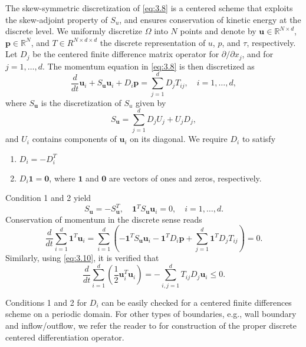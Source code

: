The skew-symmetric discretization of \eqref{eq:3.8} is a centered scheme that exploits the skew-adjoint property of $S_u$, and ensures conservation of kinetic energy at the discrete level. We uniformly discretize $\Omega$ into $N$ points and denote by $\mathbf u \in \mathbb R^{N\times d}$, $\mathbf p \in \mathbb R^N$, and $T \in R^{N\times d\times d} $ the discrete representation of $u$, $p$, and $\tau$, respectively. Let $D_j$ be the centered finite difference matrix operator for $\partial / \partial x_j$, and for $j = 1,\dots,d$. The momentum equation in \eqref{eq:3.8} is then discretized as
\begin{equation} \label{eq:3.13}
	\frac{d}{dt}{\mathbf u}_i + S_{\mathbf u} \mathbf u_i + D_i \mathbf p = \sum_{j=1}^d D_j T_{ij}, \quad i=1,\dots,d,
\end{equation}
where $S_{\mathbf u}$ is the discretization of $S_{u}$ given by
\begin{equation} \label{eq:3.14}
	S_{\mathbf u} = \sum_{j=1}^d D_j U_j + U_j D_j,
\end{equation}
and $U_i$ contains components of $\mathbf u_i$ on its diagonal. We require $D_i$ to satisfy
\begin{enumerate}
	\item $D_i = -D_i^T$
	\item $D_i \mathbf 1 = \mathbf 0$, where $\mathbf 1$ and $\mathbf 0$ are vectors of ones and zeros, respectively.
\end{enumerate}
Condition 1 and 2 yield
\begin{equation} \label{eq:3.15}
	S_{\mathbf u} = -S_{\mathbf u}^T, \quad \mathbf 1^T S_{\mathbf u} \mathbf u_i = 0, \quad i=1,\dots,d.
\end{equation}
Conservation of momentum in the discrete sense reads
\begin{equation} \label{eq:3.16}
	\frac{d}{dt} \sum_{i=1}^d  \mathbf 1^T \mathbf u_i = \sum_{i=1}^d \left( - \mathbf 1^T S_{\mathbf u} \mathbf u_i - \mathbf 1^T D_i \mathbf p + \sum_{j=1}^d \mathbf 1^T D_j T_{ij}  \right) = 0.
\end{equation}
Similarly, using \eqref{eq:3.10}, it is verified that
\begin{equation} \label{eq:3.17}
\frac{d}{dt} \sum_{i=1}^d \left( \frac 1 2 \mathbf u_i^T \mathbf u_i \right) = - \sum_{i,j=1}^d T_{ij}D_j \mathbf u_i \leq 0.
\end{equation}

Conditions 1 and 2 for $D_i$ can be easily checked for a centered finite differences scheme on a periodic domain. For other types of boundaries, e.g., wall boundary and inflow/outflow, we refer the reader to \cite{morinishi1998fully,desjardins2008high} for construction of the proper discrete centered differentiation operator. 

